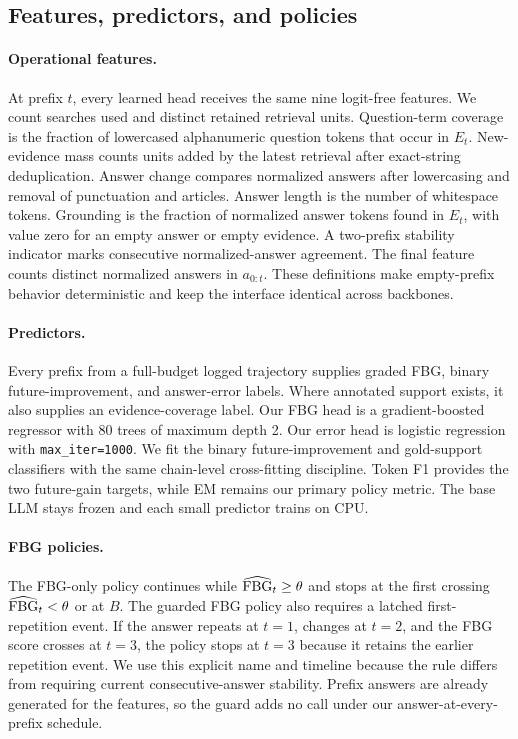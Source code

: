 \subsection{Features, predictors, and policies}
\label{sec:method}

\paragraph{Operational features.}
At prefix $t$, every learned head receives the same nine logit-free features.
We count searches used and distinct retained retrieval units. Question-term
coverage is the fraction of lowercased alphanumeric question tokens that
occur in $E_t$. New-evidence mass counts units added by the latest retrieval
after exact-string deduplication. Answer change compares normalized answers
after lowercasing and removal of punctuation and articles. Answer length is
the number of whitespace tokens. Grounding is the fraction of normalized
answer tokens found in $E_t$, with value zero for an empty answer or empty
evidence. A two-prefix stability indicator marks consecutive normalized-answer
agreement. The final feature counts distinct normalized answers in
$a_{0:t}$. These definitions make empty-prefix behavior deterministic and
keep the interface identical across backbones.

\paragraph{Predictors.}
Every prefix from a full-budget logged trajectory supplies graded FBG, binary
future-improvement, and answer-error labels. Where annotated support exists,
it also supplies an evidence-coverage label. Our FBG head is a
gradient-boosted regressor with 80 trees of maximum depth 2. Our error head is
logistic regression with \texttt{max\_iter=1000}. We fit the binary
future-improvement and gold-support classifiers with the same chain-level
cross-fitting discipline. Token F1 provides the two future-gain targets,
while EM remains our primary policy metric. The base LLM stays frozen and each
small predictor trains on CPU.

\paragraph{FBG policies.}
The FBG-only policy continues while $\widehat{\mathrm{FBG}}_t\ge\theta$ and stops at the
first crossing $\widehat{\mathrm{FBG}}_t<\theta$ or at $B$. The guarded FBG policy also
requires a latched first-repetition event. If the answer repeats at $t=1$,
changes at $t=2$, and the FBG score crosses at $t=3$, the policy stops at
$t=3$ because it retains the earlier repetition event. We use this explicit
name and timeline because the rule differs from requiring current
consecutive-answer stability. Prefix answers are already generated for the
features, so the guard adds no call under our answer-at-every-prefix schedule.

